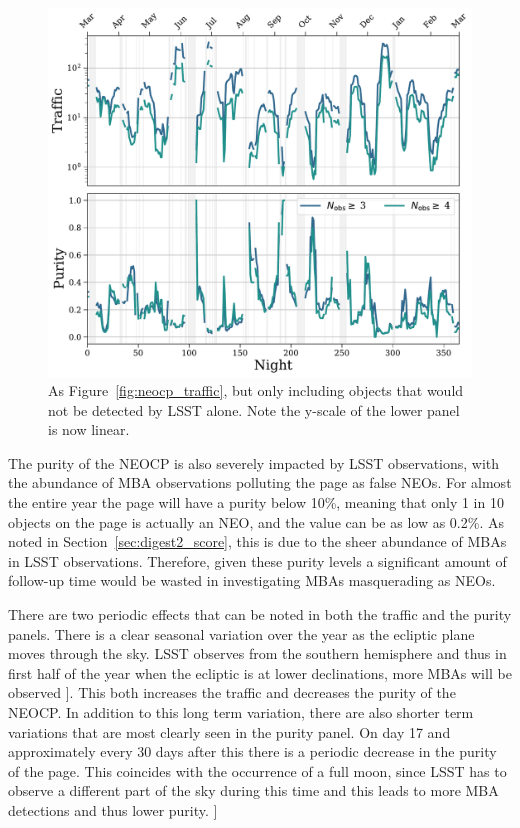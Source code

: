 \documentclass[twocolumn]{aastex631}
\newcommand{\todo}[1]{{\color{red}{[TODO: #1}]}}
\begin{document}
\begin{figure}
    \centering
    \includegraphics[width=\textwidth]{traffic_purity_unfindable.pdf}
    \caption{As Figure~\ref{fig:neocp_traffic}, but only including objects that would not be detected by LSST alone. Note the y-scale of the lower panel is now linear.}
    \label{fig:neocp_traffic_unfindable}
\end{figure}

The purity of the NEOCP is also severely impacted by LSST observations, with the abundance of MBA observations polluting the page as false NEOs. For almost the entire year the page will have a purity below 10\%, meaning that only 1 in 10 objects on the page is actually an NEO, and the value can be as low as 0.2\%. As noted in Section~\ref{sec:digest2_score}, this is due to the sheer abundance of MBAs in LSST observations. Therefore, given these purity levels a significant amount of follow-up time would be wasted in investigating MBAs masquerading as NEOs.

There are two periodic effects that can be noted in both the traffic and the purity panels. There is a clear seasonal variation over the year as the ecliptic plane moves through the sky. LSST observes from the southern hemisphere and thus in first half of the year when the ecliptic is at lower declinations, more MBAs will be observed \todo{@Mario I think this I have this backwards, ecliptic is high in July right? ...but the traffic definitely peaks in the first half??}. This both increases the traffic and decreases the purity of the NEOCP. In addition to this long term variation, there are also shorter term variations that are most clearly seen in the purity panel. On day 17 and approximately every 30 days after this there is a periodic decrease in the purity of the page. This coincides with the occurrence of a full moon, since LSST has to observe a different part of the sky during this time and this leads to more MBA detections and thus lower purity. \todo{I left this a bit handwavy, need to check with Mario}
\end{document}
